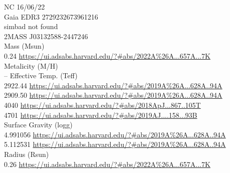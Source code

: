 NC 16/06/22\\
Gaia EDR3 2729232673961216\\
simbad not found\\

2MASS J03132588-2447246 \\
Mass (Msun)\\
0.24 \url{https://ui.adsabs.harvard.edu/?#abs/2022A%26A...657A...7K}\\
Metalicity (M/H)\\
--
Effective Temp. (Teff)\\
2922.44 \url{https://ui.adsabs.harvard.edu/?#abs/2019A%26A...628A..94A}\\
2909.50 \url{https://ui.adsabs.harvard.edu/?#abs/2019A%26A...628A..94A}\\
4040 \url{https://ui.adsabs.harvard.edu/?#abs/2018ApJ...867..105T}\\
4701 \url{https://ui.adsabs.harvard.edu/?#abs/2019AJ....158...93B}\\
Surface Gravity (logg)\\
4.991056 \url{https://ui.adsabs.harvard.edu/?#abs/2019A%26A...628A..94A}\\
5.112531 \url{https://ui.adsabs.harvard.edu/?#abs/2019A%26A...628A..94A}\\
Radius (Rsun)\\
0.26 \url{https://ui.adsabs.harvard.edu/?#abs/2022A%26A...657A...7K}\\


